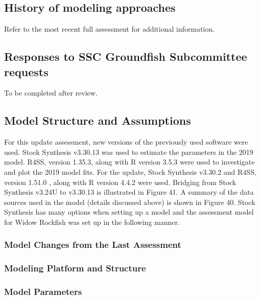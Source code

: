 \documentclass[
]{scrartcl}
\begin{document}
\subsection{History of modeling
approaches}\label{history-of-modeling-approaches}

Refer to the most recent full assessment for additional information.

\subsection{Responses to SSC Groundfish Subcommittee
requests}\label{responses-to-ssc-groundfish-subcommittee-requests}

To be completed after review.

\subsection{Model Structure and
Assumptions}\label{model-structure-and-assumptions}

For this update assessment, new versions of the previously used software
were used. Stock Synthesis v3.30.13 was used to estimate the parameters
in the 2019 model. R4SS, version 1.35.3, along with R version 3.5.3 were
used to investigate and plot the 2019 model fits. For the update, Stock
Synthesis v3.30.2 and R4SS, version 1.51.0 , along with R version 4.4.2
were used. Bridging from Stock Synthesis v3.24U to v3.30.13 is
illustrated in Figure 41. A summary of the data sources used in the
model (details discussed above) is shown in Figure 40. Stock Synthesis
has many options when setting up a model and the assessment model for
Widow Rockfish was set up in the following manner.

\subsubsection{Model Changes from the Last
Assessment}\label{model-changes-from-the-last-assessment}

\subsubsection{Modeling Platform and
Structure}\label{modeling-platform-and-structure}

\subsubsection{Model Parameters}\label{model-parameters}
\end{document}
